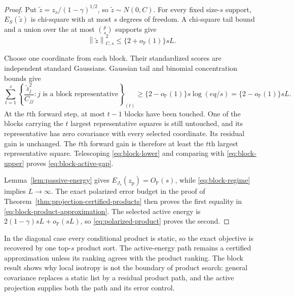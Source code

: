 \documentclass[a4paper,11pt,english]{article}
\newcommand{\Prob}{\mathbb P}
\newcommand{\norm}[1]{\left\lVert #1\right\rVert}
\begin{document}
\begin{proof}
Put $\widetilde z=z_{\mathrm a}/(1-\gamma)^{1/2}$, so
$\widetilde z\sim N(0,C)$.  For every fixed size-$s$ support,
$E_S(\widetilde z)$ is chi-square with at most $s$ degrees of freedom.
A chi-square tail bound and a union over the at most $\binom ps$ supports
give
\begin{equation}\label{eq:block-upper}
        \norm{\widetilde z}_{C,s}^2
        \le\{2+o_{\Prob}(1)\}sL.
\end{equation}

Choose one coordinate from each block.  Their standardized scores are
independent standard Gaussians.  Gaussian tail and binomial concentration
bounds give
\begin{equation}\label{eq:block-lower}
        \sum_{t=1}^s
        \left\{\frac{\widetilde z_j^2}{C_{jj}}:
        j\text{ is a block representative}\right\}_{(t)}
        \ge\{2-o_{\Prob}(1)\}s\log(eq/s)
        =\{2-o_{\Prob}(1)\}sL.
\end{equation}
At the $t$th forward step, at most $t-1$ blocks have been touched.  One
of the blocks carrying the $t$ largest representative squares is still
untouched, and its representative has zero covariance with every
selected coordinate.  Its residual gain is unchanged.  The $t$th
forward gain is therefore at least the $t$th largest representative
square.  Telescoping \eqref{eq:block-lower} and comparing with
\eqref{eq:block-upper} proves \eqref{eq:block-active-gap}.

Lemma~\ref{lem:passive-energy} gives $E_{J_s}(z_{\mathrm p})=O_{\Prob}(s)$, while
\eqref{eq:block-regime} implies $L\to\infty$.  The exact polarized error
budget in the proof of Theorem~\ref{thm:projection-certified-products}
then proves the first equality in
\eqref{eq:block-product-approximation}.  The selected active energy is
$2(1-\gamma)sL+o_{\Prob}(sL)$, so
\eqref{eq:polarized-product} proves the second.
\end{proof}

In the diagonal case every conditional product is static, so the exact
objective is recovered by one top-$s$ product sort.  The active-energy path
remains a certified approximation unless its ranking agrees with the product
ranking.  The block result shows why local isotropy is not the
boundary of product search: general covariance replaces a static list by
a residual product path, and the active projection supplies both the path
and its error control.
\end{document}
